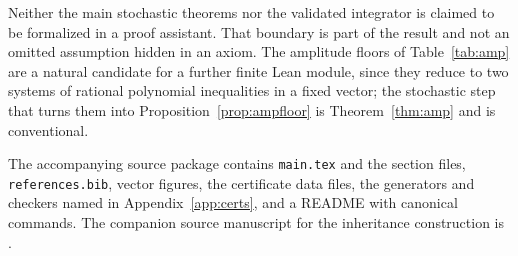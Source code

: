 Neither the main stochastic theorems nor the validated integrator is claimed to
be formalized in a proof assistant. That boundary is part of the result and not
an omitted assumption hidden in an axiom. The amplitude floors of
Table~\ref{tab:amp} are a natural candidate for a further finite Lean module,
since they reduce to two systems of rational polynomial inequalities in a fixed
vector; the stochastic step that turns them into
Proposition~\ref{prop:ampfloor} is Theorem~\ref{thm:amp} and is conventional.

The accompanying source package contains \texttt{main.tex} and the section
files, \texttt{references.bib}, vector figures, the certificate data files, the
generators and checkers named in Appendix~\ref{app:certs}, and a README with
canonical commands. The companion source manuscript for the inheritance
construction is \citet{molecular}.
